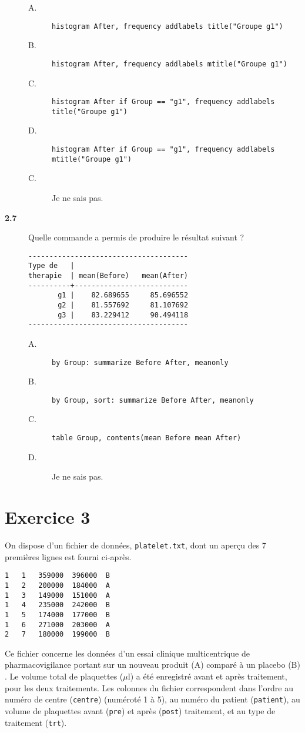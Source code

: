 \begin{description}
  \begin{description}
  \item[A.] \verb|histogram After, frequency addlabels title("Groupe g1")|
  \item[B.] \verb|histogram After, frequency addlabels mtitle("Groupe g1")|
  \item[C.] \verb|histogram After if Group == "g1", frequency addlabels title("Groupe g1")|
  \item[D.] \verb|histogram After if Group == "g1", frequency addlabels mtitle("Groupe g1")|
  \item[C.] Je ne sais pas.
  \end{description}
\item[\bf 2.7] Quelle commande a permis de produire le résultat suivant ? 
\begin{verbatim}
--------------------------------------
Type de   |
therapie  | mean(Before)   mean(After)
----------+---------------------------
       g1 |    82.689655     85.696552
       g2 |    81.557692     81.107692
       g3 |    83.229412     90.494118
--------------------------------------
\end{verbatim}
  \begin{description}
  \item[A.] \verb|by Group: summarize Before After, meanonly|
  \item[B.] \verb|by Group, sort: summarize Before After, meanonly|
  \item[C.] \verb|table Group, contents(mean Before mean After)|
  \item[D.] Je ne sais pas.
  \end{description}
\end{description}

\section*{Exercice 3}\label{dev7:exo3}
On dispose d'un fichier de données, \texttt{platelet.txt}, dont un aperçu
des 7 premières lignes est fourni ci-après.
\begin{verbatim}
1	1	359000	396000	B
1	2	200000	184000	A
1	3	149000	151000	A
1	4	235000	242000	B
1	5	174000	177000	B
1	6	271000	203000	A
2	7	180000	199000	B
\end{verbatim}
Ce fichier concerne les données d'un essai clinique multicentrique de
pharmacovigilance portant sur un nouveau produit (A) comparé à un placebo
(B) \citep{chow04}. Le volume total de plaquettes ($\mu$l) a été enregistré
avant et après traitement, pour les deux traitements. Les colonnes du
fichier correspondent dans l'ordre au numéro de centre (\texttt{centre})
(numéroté 1 à 5), au numéro du patient (\texttt{patient}), au volume de
plaquettes avant (\texttt{pre}) et après (\texttt{post}) traitement, et au
type de traitement (\texttt{trt}).


